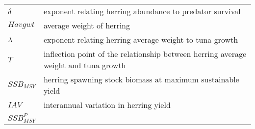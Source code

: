 \documentclass[]{article}
\begin{document}
\begin{longtable}[]{@{}ll@{}}
\begin{minipage}[t]{0.13\columnwidth}\raggedright\strut
\(\delta\)\strut
\end{minipage} & \begin{minipage}[t]{0.76\columnwidth}\raggedright\strut
exponent relating herring abundance to predator survival\strut
\end{minipage}\tabularnewline
\begin{minipage}[t]{0.13\columnwidth}\raggedright\strut
\(Havgwt\)\strut
\end{minipage} & \begin{minipage}[t]{0.76\columnwidth}\raggedright\strut
average weight of herring\strut
\end{minipage}\tabularnewline
\begin{minipage}[t]{0.13\columnwidth}\raggedright\strut
\(\lambda\)\strut
\end{minipage} & \begin{minipage}[t]{0.76\columnwidth}\raggedright\strut
exponent relating herring average weight to tuna growth\strut
\end{minipage}\tabularnewline
\begin{minipage}[t]{0.13\columnwidth}\raggedright\strut
\(T\)\strut
\end{minipage} & \begin{minipage}[t]{0.76\columnwidth}\raggedright\strut
inflection point of the relationship between herring average weight and
tuna growth\strut
\end{minipage}\tabularnewline
\begin{minipage}[t]{0.13\columnwidth}\raggedright\strut
\(SSB_{MSY}\)\strut
\end{minipage} & \begin{minipage}[t]{0.76\columnwidth}\raggedright\strut
herring spawning stock biomass at maximum sustainable yield\strut
\end{minipage}\tabularnewline
\begin{minipage}[t]{0.13\columnwidth}\raggedright\strut
\(IAV\)\strut
\end{minipage} & \begin{minipage}[t]{0.76\columnwidth}\raggedright\strut
interannual variation in herring yield\strut
\end{minipage}\tabularnewline
\begin{minipage}[t]{0.13\columnwidth}\raggedright\strut
\(SSB_{MSY}^P\)\strut
\end{minipage} & \begin{minipage}[t]{0.76\columnwidth}\raggedright\strut

\end{minipage}
\end{longtable}
\end{document}
